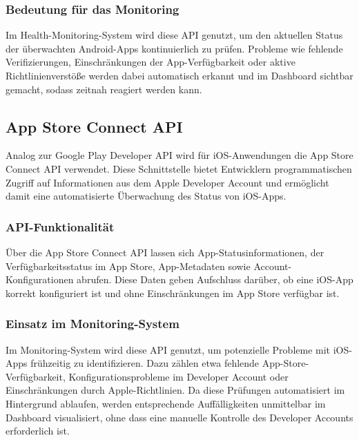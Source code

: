 \subsubsection{Bedeutung für das Monitoring}
Im Health-Monitoring-System wird diese API genutzt, um den aktuellen Status der überwachten Android-Apps kontinuierlich zu prüfen. Probleme wie fehlende Verifizierungen, Einschränkungen der App-Verfügbarkeit oder aktive Richtlinienverstöße werden dabei automatisch erkannt und im Dashboard sichtbar gemacht, sodass zeitnah reagiert werden kann.


\subsection{App Store Connect API}
Analog zur Google Play Developer API wird für iOS-Anwendungen die App Store Connect API verwendet. Diese Schnittstelle bietet Entwicklern programmatischen Zugriff auf Informationen aus dem Apple Developer Account und ermöglicht damit eine automatisierte Überwachung des Status von iOS-Apps. \cite{apple_api}

\subsubsection{API-Funktionalität}
Über die App Store Connect API lassen sich App-Statusinformationen, der Verfügbarkeitsstatus im App Store, App-Metadaten sowie Account-Konfigurationen abrufen. Diese Daten geben Aufschluss darüber, ob eine iOS-App korrekt konfiguriert ist und ohne Einschränkungen im App Store verfügbar ist.

\subsubsection{Einsatz im Monitoring-System}
Im Monitoring-System wird diese API genutzt, um potenzielle Probleme mit iOS-Apps frühzeitig zu identifizieren. Dazu zählen etwa fehlende App-Store-Verfügbarkeit, Konfigurationsprobleme im Developer Account oder Einschränkungen durch Apple-Richtlinien. Da diese Prüfungen automatisiert im Hintergrund ablaufen, werden entsprechende Auffälligkeiten unmittelbar im Dashboard visualisiert, ohne dass eine manuelle Kontrolle des Developer Accounts erforderlich ist.